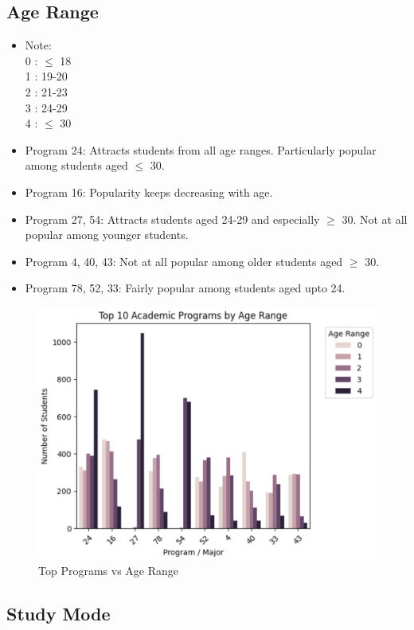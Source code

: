 \documentclass[12pt]{article}
\begin{document}
\subsection{Age Range}
\begin{itemize}
    \item Note:\\
    0 : $\leq$ 18\\
    1 : 19-20\\
    2 : 21-23\\
    3 : 24-29\\
    4 : $\leq$ 30
    
    \item Program 24: Attracts students from all age ranges. Particularly popular among students aged $\leq$ 30.

    \item Program 16: Popularity keeps decreasing with age.

    \item Program 27, 54: Attracts students aged 24-29 and especially $\geq$ 30. Not at all popular among younger students.

    \item Program 4, 40, 43: Not at all popular among older students aged $\geq$ 30.
    
    \item Program 78, 52, 33: Fairly popular among students aged upto 24.
\end{itemize}

\begin{figure}[H]
    \centering
    \includegraphics[width=0.7\linewidth]{top_programs_age_range.png}
    \caption{Top Programs vs Age Range}
\end{figure}

\subsection{Study Mode}
\end{document}
